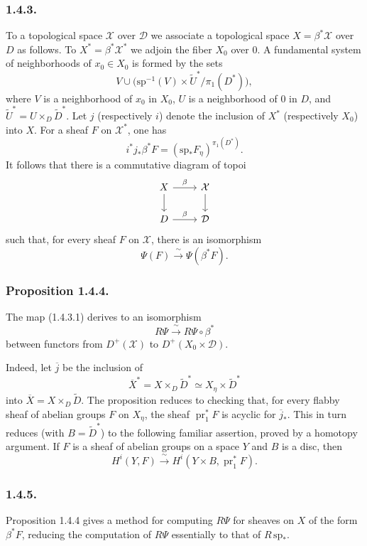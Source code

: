 \subsubsection*{1.4.3.}
To a topological space $\mathcal X$ over $\mathcal D$ we associate a
topological space $X=\beta^*\mathcal X$ over $D$ as follows.  To
$X^*=\beta^*\mathcal X^*$ we adjoin the fiber $X_0$ over $0$.  A
fundamental system of neighborhoods of $x_0\in X_0$ is formed by the
sets
\[
V\cup
\bigl(\mathrm{sp}^{-1}(V)\times\widetilde U^*/\pi_1(D^*)\bigr),
\]
where $V$ is a neighborhood of $x_0$ in $X_0$, $U$ is a neighborhood
of $0$ in $D$, and
$\widetilde U^*=U\times_D\widetilde D^*$.  Let $j$ (respectively $i$)
denote the inclusion of $X^*$ (respectively $X_0$) into $X$.  For a
sheaf $F$ on $\mathcal X^*$, one has
\[
i^*j_*\beta^*F
=(\mathrm{sp}_*F_\eta)^{\pi_1(D^*)}.
\]
It follows that there is a commutative diagram of topoi
\[
\begin{tikzcd}
X \arrow[r, "\beta"] \arrow[d]
  & \mathcal X \arrow[d] \\
D \arrow[r, "\beta"]
  & \mathcal D
\end{tikzcd}
\]
such that, for every sheaf $F$ on $\mathcal X$, there is an
isomorphism
\begin{equation}\tag{1.4.3.1}
\Psi(F)\xrightarrow{\ \sim\ }\Psi(\beta^*F).
\end{equation}

\subsubsection*{Proposition 1.4.4.}
The map (1.4.3.1) derives to an isomorphism
\[
R\Psi\xrightarrow{\ \sim\ }R\Psi\circ\beta^*
\]
between functors from $D^+(\mathcal X)$ to
$D^+(X_0\times\mathcal D)$.

Indeed, let $\overline j$ be the inclusion of
\[
\overline X^*=X\times_D\widetilde D^*
\simeq X_\eta\times\widetilde D^*
\]
into $\overline X=X\times_D\widetilde D$.  The proposition reduces to
checking that, for every flabby sheaf of abelian groups $F$ on
$X_\eta$, the sheaf $\operatorname{pr}_1^*F$ is acyclic for
$\overline j_*$.  This in turn reduces (with $B=\widetilde D^*$) to
the following familiar assertion, proved by a homotopy argument.  If
$F$ is a sheaf of abelian groups on a space $Y$ and $B$ is a disc,
then
\[
H^i(Y,F)\xrightarrow{\ \sim\ }
H^i(Y\times B,\operatorname{pr}_1^*F).
\]

\subsubsection*{1.4.5.}
Proposition 1.4.4 gives a method for computing $R\Psi$ for sheaves on
$X$ of the form $\beta^*F$, reducing the computation of $R\Psi$
essentially to that of $R\,\mathrm{sp}_*$.

